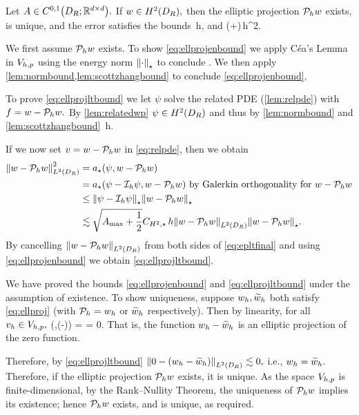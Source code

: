 \label{lem:ellprojbounds}
Let $A \in \CzoDRRRdtd.$ If $w \in \HtDR,$ then the elliptic projection $\mathcal P_{h} w$ exists, is unique, and the error satisfies the bounds
\beq\label{eq:ellprojenbound}
 \lesssim \sqrt{\Amax+\half}\,h,
\eeq
and
\beq\label{eq:ellprojltbound}
 \lesssim  \mleft(\Amax+\half\mright)\CHtell\,h^2.
\eeq
\ele

We first assume $\mathcal P_{h} w$ exists. To show \eqref{eq:ellprojenbound} we apply C\'{e}a's Lemma in $V_{h,p}$ using the energy norm $\Npi{\cdot}$ to conclude
\beqs
{} \leq {}.
\eeqs
We then apply \cref{lem:normbound,lem:scottzhangbound} to conclude \eqref{eq:ellprojenbound}.

To prove \eqref{eq:ellprojltbound} we let $\psi$ solve the related PDE (\cref{lem:relpde}) with $f = w-\mathcal P_{h} w.$ By \cref{lem:relatedwp} $\psi \in \HtDR$ and thus by  \cref{lem:normbound} and \cref{lem:scottzhangbound}
\beqs
\Npi{\psi - \Ih \psi} \lesssim \sqrt{\Amax + \half}\CHtell \,h.
\eeqs

If we now set $v = w-\mathcal P_{h} w$ in \eqref{eq:relpde}, then we obtain
\begin{align}
  \NLtDR{w - \Ph w}^2 &= \api\mleft(\psi,w-\Ph w\mright)\nonumber\\
                     &= \api\mleft(\psi-\Ih \psi,w-\Ph w\mright) \text{ by Galerkin orthogonality for } w-\Ph w\nonumber\\
                     &\leq \Npi{\psi-\Ih \psi}\Npi{w-\Ph w}\nonumber\\
                       &\lesssim \sqrt{\Amax + \half}\CHtell \,h\NLtDR{w-\Ph w}\Npi{w-\Ph w}\label{eq:epltfinal}.
\end{align}
By cancelling $\NLtDR{w- \Ph w}$ from both sides of \eqref{eq:epltfinal} and using \eqref{eq:ellprojenbound} we obtain \eqref{eq:ellprojltbound}.

We have proved the bounds \eqref{eq:ellprojenbound} and \eqref{eq:ellprojltbound} under the assumption of existence. To show uniqueness, suppose $w_{h}, \widetilde{w}_{h}$ both satisfy \eqref{eq:ellproj} (with $\mathcal P_{h} = w_{h}$ or $\widetilde{w}_{h}$ respectively). Then by linearity, for all $v_{h} \in V_{h,p},$
\beqs
\api\mleft(\vh,\Ph\mleft(\wh-\whtilde\mright)\mright) =  = 0.
\eeqs
That is, the function $w_{h} - \widetilde{w}_{h}$ is an elliptic projection of the zero function.

Therefore, by \eqref{eq:ellprojltbound} $\NLtDR{0 - \mleft(\wh - \whtilde\mright)} \lesssim 0,$ i.e., $w_{h} = \widetilde{w}_{h}.$ Therefore, if the elliptic projection $\mathcal P_{h} w$ exists, it is unique. As the space $V_{h,p}$ is finite-dimensional, by the Rank--Nullity Theorem, the uniqueness of $\mathcal P_{h} w$ implies its existence; hence $\mathcal P_{h} w$ exists, and is unique, as required.
\epf


